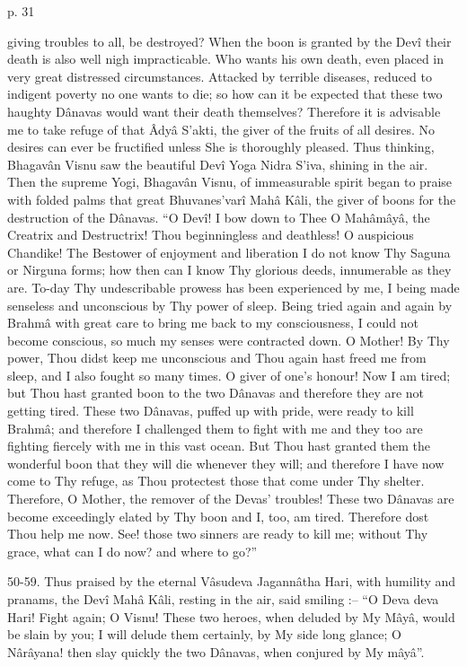  

p. 31

 

giving troubles to all, be destroyed? When the boon is granted by the Devî their death is also well nigh impracticable. Who wants his own death, even placed in very great distressed circumstances. Attacked by terrible diseases, reduced to indigent poverty no one wants to die; so how can it be expected that these two haughty Dânavas would want their death themselves? Therefore it is advisable me to take refuge of that Âdyâ S’akti, the giver of the fruits of all desires. No desires can ever be fructified unless She is thoroughly pleased. Thus thinking, Bhagavân Visnu saw the beautiful Devî Yoga Nidra S’iva, shining in the air. Then the supreme Yogi, Bhagavân Visnu, of immeasurable spirit began to praise with folded palms that great Bhuvanes'varî Mahâ Kâli, the giver of boons for the destruction of the Dânavas. “O Devî! I bow down to Thee O Mahâmâyâ, the Creatrix and Destructrix! Thou beginningless and deathless! O auspicious Chandike! The Bestower of enjoyment and liberation I do not know Thy Saguna or Nirguna forms; how then can I know Thy glorious deeds, innumerable as they are. To-day Thy undescribable prowess has been experienced by me, I being made senseless and unconscious by Thy power of sleep. Being tried again and again by Brahmâ with great care to bring me back to my consciousness, I could not become conscious, so much my senses were contracted down. O Mother! By Thy power, Thou didst keep me unconscious and Thou again hast freed me from sleep, and I also fought so many times. O giver of one's honour! Now I am tired; but Thou hast granted boon to the two Dânavas and therefore they are not getting tired. These two Dânavas, puffed up with pride, were ready to kill Brahmâ; and therefore I challenged them to fight with me and they too are fighting fiercely with me in this vast ocean. But Thou hast granted them the wonderful boon that they will die whenever they will; and therefore I have now come to Thy refuge, as Thou protectest those that come under Thy shelter. Therefore, O Mother, the remover of the Devas' troubles! These two Dânavas are become exceedingly elated by Thy boon and I, too, am tired. Therefore dost Thou help me now. See! those two sinners are ready to kill me; without Thy grace, what can I do now? and where to go?”

 

50-59. Thus praised by the eternal Vâsudeva Jagannâtha Hari, with humility and pranams, the Devî Mahâ Kâli, resting in the air, said smiling :-- “O Deva deva Hari! Fight again; O Visnu! These two heroes, when deluded by My Mâyâ, would be slain by you; I will delude them certainly, by My side long glance; O Nârâyana! then slay quickly the two Dânavas, when conjured by My mâyâ”.

